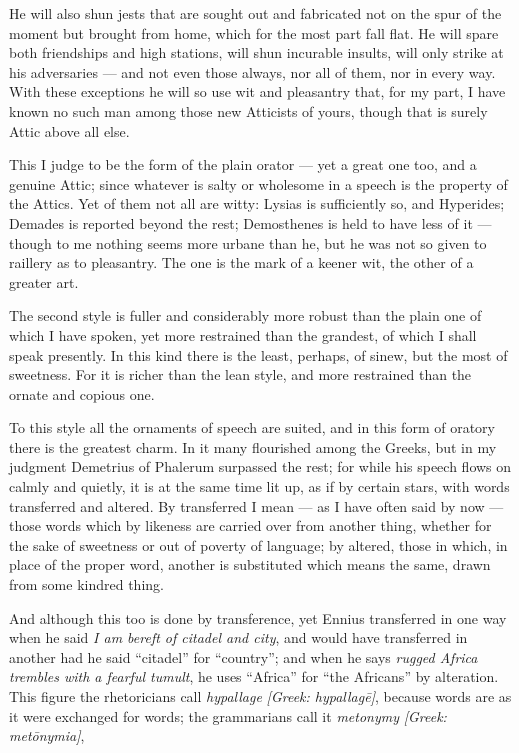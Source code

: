  He will also shun jests that are sought out and fabricated not on the spur of the moment but brought from home, which for the most part fall flat. He will spare both friendships and high stations, will shun incurable insults, will only strike at his adversaries — and not even those always, nor all of them, nor in every way. With these exceptions he will so use wit and pleasantry that, for my part, I have known no such man among those new Atticists of yours, though that is surely Attic above all else.

 This I judge to be the form of the plain orator — yet a great one too, and a genuine Attic; since whatever is salty or wholesome in a speech is the property of the Attics. Yet of them not all are witty: Lysias is sufficiently so, and Hyperides; Demades is reported beyond the rest; Demosthenes is held to have less of it — though to me nothing seems more urbane than he, but he was not so given to raillery as to pleasantry. The one is the mark of a keener wit, the other of a greater art.

 The second style is fuller and considerably more robust than the plain one of which I have spoken, yet more restrained than the grandest, of which I shall speak presently. In this kind there is the least, perhaps, of sinew, but the most of sweetness. For it is richer than the lean style, and more restrained than the ornate and copious one.

 To this style all the ornaments of speech are suited, and in this form of oratory there is the greatest charm. In it many flourished among the Greeks, but in my judgment Demetrius of Phalerum surpassed the rest; for while his speech flows on calmly and quietly, it is at the same time lit up, as if by certain stars, with words transferred and altered. By transferred I mean — as I have often said by now — those words which by likeness are carried over from another thing, whether for the sake of sweetness or out of poverty of language; by altered, those in which, in place of the proper word, another is substituted which means the same, drawn from some kindred thing.

 And although this too is done by transference, yet Ennius transferred in one way when he said \textit{I am bereft of citadel and city}, and would have transferred in another had he said ``citadel'' for ``country''; and when he says \textit{rugged Africa trembles with a fearful tumult}, he uses ``Africa'' for ``the Africans'' by alteration. This figure the rhetoricians call \textit{hypallage} \textit{[Greek: hypallagē]}, because words are as it were exchanged for words; the grammarians call it \textit{metonymy} \textit{[Greek: metōnymia]},

